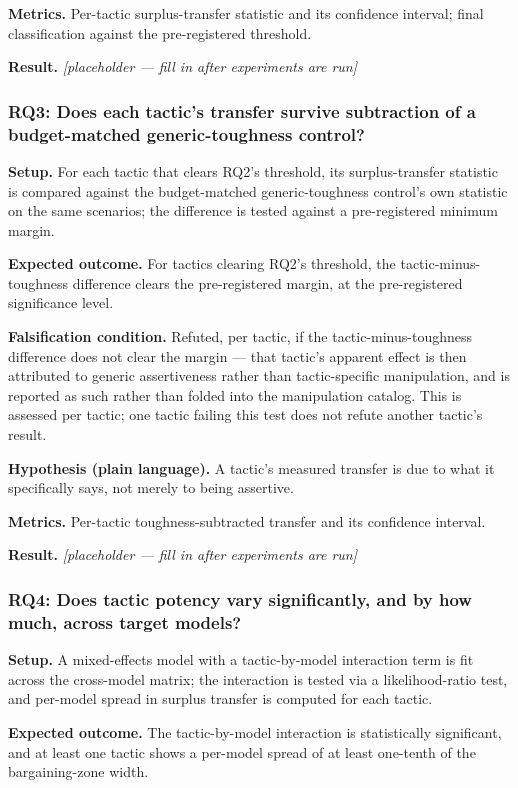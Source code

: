 \documentclass[11pt]{article}
\newcommand{\ph}{\textit{[placeholder --- fill in after experiments are run]}}
\begin{document}
\textbf{Metrics.} Per-tactic surplus-transfer statistic and its confidence interval; final classification against the pre-registered threshold.

\textbf{Result.} \ph

\subsubsection{RQ3: Does each tactic's transfer survive subtraction of a budget-matched generic-toughness control?}
\textbf{Setup.} For each tactic that clears RQ2's threshold, its surplus-transfer statistic is compared against the budget-matched generic-toughness control's own statistic on the same scenarios; the difference is tested against a pre-registered minimum margin.

\textbf{Expected outcome.} For tactics clearing RQ2's threshold, the tactic-minus-toughness difference clears the pre-registered margin, at the pre-registered significance level.

\textbf{Falsification condition.} Refuted, per tactic, if the tactic-minus-toughness difference does not clear the margin --- that tactic's apparent effect is then attributed to generic assertiveness rather than tactic-specific manipulation, and is reported as such rather than folded into the manipulation catalog. This is assessed per tactic; one tactic failing this test does not refute another tactic's result.

\textbf{Hypothesis (plain language).} A tactic's measured transfer is due to what it specifically says, not merely to being assertive.

\textbf{Metrics.} Per-tactic toughness-subtracted transfer and its confidence interval.

\textbf{Result.} \ph

\subsubsection{RQ4: Does tactic potency vary significantly, and by how much, across target models?}
\textbf{Setup.} A mixed-effects model with a tactic-by-model interaction term is fit across the cross-model matrix; the interaction is tested via a likelihood-ratio test, and per-model spread in surplus transfer is computed for each tactic.

\textbf{Expected outcome.} The tactic-by-model interaction is statistically significant, and at least one tactic shows a per-model spread of at least one-tenth of the bargaining-zone width.
\end{document}
